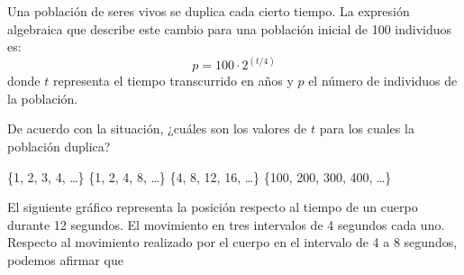 \documentclass[10pt,letterpaper,addpoints]{exam}
\begin{document}
\begin{questions}
\question Una población de seres vivos se duplica cada cierto tiempo. La expresión algebraica que describe este cambio para una población inicial de 100 individuos es:
\[p=100\cdot 2^{(t/4)}\]
donde $t$ representa el tiempo transcurrido en años y $p$ el número de individuos de la población.

De acuerdo con la situación, ¿cuáles son los valores de $t$ para los cuales la población duplica?

\begin{oneparchoices}
\choice \{1, 2, 3, 4, \ldots \}
\choice \{1, 2, 4, 8, \ldots \}
\CorrectChoice \{4, 8, 12, 16, \ldots \}
\choice \{100, 200, 300, 400, \ldots \}
\end{oneparchoices}
\begin{minipage}{.4\textwidth}
\question \label{preg-1}
El siguiente gráfico representa la posición respecto al tiempo de un cuerpo durante 12 segundos. El movimiento en tres intervalos de 4 segundos cada uno.\\

Respecto al movimiento realizado por el cuerpo en el intervalo de 4 a 8 segundos, podemos afirmar que
\end{minipage}\hfill
\begin{minipage}{.6\textwidth}
\end{minipage}


\end{questions}
\end{document}
